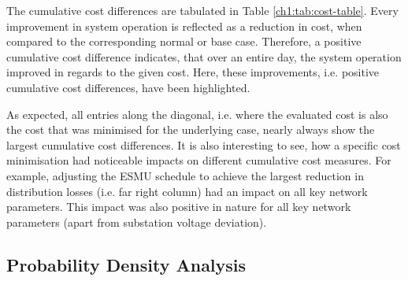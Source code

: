 

The cumulative cost differences are tabulated in Table \ref{ch1:tab:cost-table}.
Every improvement in system operation is reflected as a reduction in cost, when compared to the corresponding normal or base case.
Therefore, a positive cumulative cost difference indicates, that over an entire day, the system operation improved in regards to the given cost.
Here, these improvements, i.e. positive cumulative cost differences, have been highlighted.

As expected, all entries along the diagonal, i.e. where the evaluated cost is also the cost that was minimised for the underlying case, nearly always show the largest cumulative cost differences.
It is also interesting to see, how a specific cost minimisation had noticeable impacts on different cumulative cost measures.
For example, adjusting the ESMU schedule to achieve the largest reduction in distribution losses (i.e. far right column) had an impact on all key network parameters.
This impact was also positive in nature for all key network parameters (apart from substation voltage deviation).


\subsection{Probability Density Analysis}
\label{ch1:subsec:probability-density-analysis}



